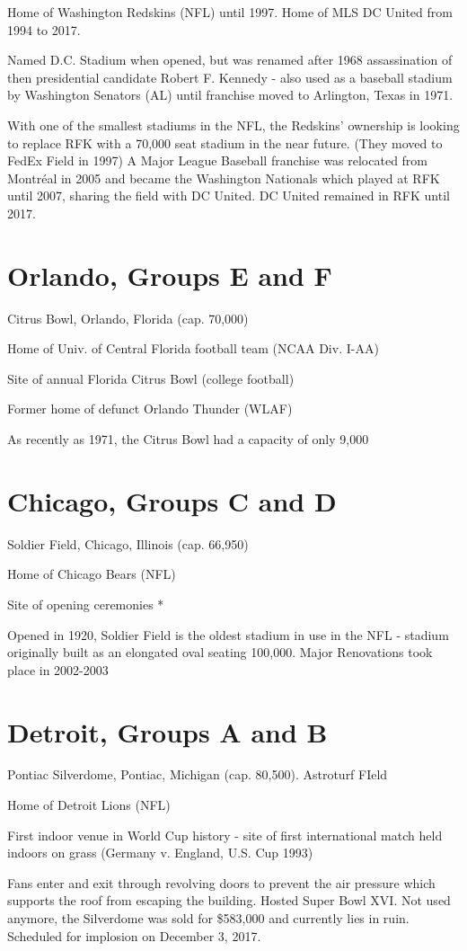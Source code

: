 Home of Washington Redskins (NFL) until 1997.  Home of MLS DC United from 1994 to 2017.

Named D.C. Stadium when opened, but was renamed after 1968 assassination of 
then presidential candidate Robert F. Kennedy - also used as a baseball stadium
by Washington Senators (AL) until franchise moved to Arlington, Texas in 1971.

With one of the smallest stadiums in the NFL, the Redskins' ownership is 
looking to replace RFK with a 70,000 seat stadium in the near future.  (They moved
to FedEx Field in 1997)  A Major League Baseball franchise was relocated from
Montr{\'e}al in 2005 and became the Washington Nationals which played at RFK until 2007,
sharing the field with DC United.  DC United remained in RFK until 2017.
\section{Orlando, Groups E and F}
Citrus Bowl, Orlando, Florida (cap. 70,000)

Home of Univ. of Central Florida football team (NCAA Div. I-AA)

Site of annual Florida Citrus Bowl (college football)

Former home of defunct Orlando Thunder (WLAF)

As recently as 1971, the Citrus Bowl had a capacity of only 9,000
\section{Chicago, Groups C and D}
Soldier Field, Chicago, Illinois (cap. 66,950)

Home of Chicago Bears (NFL)

Site of opening ceremonies *

Opened in 1920, Soldier Field is the oldest stadium in use in the NFL - stadium
originally built as an elongated oval seating 100,000.  Major Renovations took place 
in 2002-2003
\section{Detroit, Groups A and B}
Pontiac Silverdome, Pontiac, Michigan (cap. 80,500).  Astroturf FIeld

Home of Detroit Lions (NFL)

First indoor venue in World Cup history - site of first international match 
held indoors on grass (Germany v. England, U.S. Cup 1993)

Fans enter and exit through revolving doors to prevent the air pressure which 
supports the roof from escaping the building.  Hosted Super Bowl XVI. Not used anymore, the Silverdome was sold for \$583,000 and
currently lies in ruin.  Scheduled for implosion on December 3, 2017.
